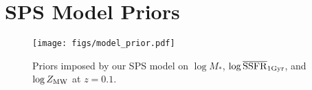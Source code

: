\section{SPS Model Priors} \label{sec:model_priors}
\begin{figure}
\begin{center}
\texttt{[image: figs/model\_prior.pdf]}
    \caption{
    Priors imposed by our SPS model on $\log M_*$, 
    $\log \overline{\rm SSFR}_{\rm 1 Gyr}$, and $\log Z_{\rm MW}$ at $z=0.1$. 
    }\label{fig:model_prior}
\end{center}
\end{figure}
